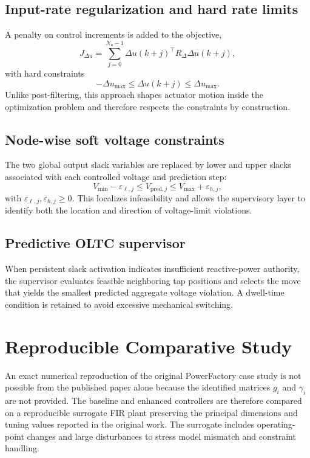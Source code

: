 \documentclass[10pt,twocolumn]{article}
\begin{document}
\subsection{Input-rate regularization and hard rate limits}
A penalty on control increments is added to the objective,
\begin{equation}
J_{\Delta u}=\sum_{j=0}^{N_u-1}\Delta u(k+j)^\top
R_{\Delta}\Delta u(k+j),
\end{equation}
with hard constraints
\begin{equation}
-\Delta u_{\max}\leq\Delta u(k+j)\leq\Delta u_{\max}.
\end{equation}
Unlike post-filtering, this approach shapes actuator motion inside the optimization problem and therefore respects the constraints by construction.

\subsection{Node-wise soft voltage constraints}
The two global output slack variables are replaced by lower and upper slacks associated with each controlled voltage and prediction step:
\begin{equation}
V_{\min}-\varepsilon_{\ell,j}\leq V_{\mathrm{pred},j}
\leq V_{\max}+\varepsilon_{h,j},
\end{equation}
with $\varepsilon_{\ell,j},\varepsilon_{h,j}\geq0$. This localizes infeasibility and allows the supervisory layer to identify both the location and direction of voltage-limit violations.

\subsection{Predictive OLTC supervisor}
When persistent slack activation indicates insufficient reactive-power authority, the supervisor evaluates feasible neighboring tap positions and selects the move that yields the smallest predicted aggregate voltage violation. A dwell-time condition is retained to avoid excessive mechanical switching.

\section{Reproducible Comparative Study}
An exact numerical reproduction of the original PowerFactory case study is not possible from the published paper alone because the identified matrices $g_i$ and $\gamma_i$ are not provided. The baseline and enhanced controllers are therefore compared on a reproducible surrogate FIR plant preserving the principal dimensions and tuning values reported in the original work. The surrogate includes operating-point changes and large disturbances to stress model mismatch and constraint handling.
\end{document}
